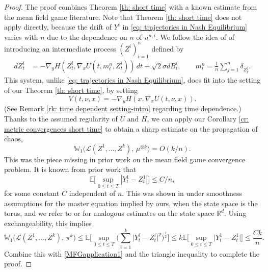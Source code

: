 \documentclass[11pt,reqno]{amsart}
\numberwithin{equation}{section}
\theoremstyle{definition}
\def\E{{\mathbb E}}
\def\R{{\mathbb R}}
\def\L{{\mathcal L}}
\newcommand{\W}{\mathbb W}
\begin{document}
\begin{proof}
The proof combines Theorem \ref{th: short time} with a known estimate from the mean field game literature.
Note that Theorem \ref{th: short time} does not apply directly, because the drift of $Y^i$ in \eqref{eq: trajectories in Nash Equilibrium} varies with $n$ due to the dependence on $n$ of $u^{n,i}$.
We follow the idea of \cite{MasterEquation} of introducing an intermediate process $(Z^i)_{i=1}^n$ defined by
\begin{align} 
    \label{eq: intermediate problem MFGs}
    dZ_t^i&=-\nabla_y H(Z_t^i,\nabla_x U(t,m_{t}^n,Z_t^i))\,dt+\sqrt 2 \sigma dB_t^i, \qquad      m_t^n= \frac 1n \sum_{j=1}^n \delta_{Z_t^j}. 
\end{align}
This system, unlike \eqref{eq: trajectories in Nash Equilibrium}, does fit into the setting of our Theorem \ref{th: short time}, by setting
\[
V(t,\nu,x) = -\nabla_y H(x,\nabla_x U(t,\nu,x)).
\]
(See Remark \ref{rk: time dependent setting-intro} regarding time dependence.) Thanks to the assumed regularity of $U$ and $H$, we can apply our Corollary \ref{cr: metric convergences short time} to obtain a sharp estimate on the propagation of chaos,
\begin{equation}
\W_1\big(\L(Z^1,\ldots,Z^k), \, \mu^{\otimes k}\big) = O(k/n). \label{MFGapplication1}
\end{equation}
This was the piece missing in prior work on the mean field game convergence problem.
It is known from prior work that
\[
\E\bigg[\sup_{0 \le t \le T}|Y^1_t-Z^1_t|\bigg] \le C/n,
\]
for some constant $C$ independent of $n$.
This was shown in \cite[Theorem 6.6]{MasterEquation} under smoothness assumptions for the master equation implied by ours, when the state space is the torus, and we refer to \cite[Theorem 6.32]{CDMFGbook2} or \cite[Theorem 4.2]{DelarueLackerRamananCLT} for analogous estimates on the state space $\R^d$. 
Using exchangeability, this implies
\begin{equation*}
\W_1\big(\L(Z^1,\ldots,Z^k), \, \pi^k\big) \le  \E\bigg[\sup_{0 \le t \le T}\Big(\sum_{i=1}^k \big|Y_t^i-Z_t^i\big|^2\Big)^{\frac 12}\bigg]\leq k \E\Big[\sup_{0 \le t \le T}\big|Y_t^1-Z_t^1\big|\Big] \leq  \frac{Ck}{n}. 
\end{equation*}
Combine this with \eqref{MFGapplication1} and the triangle inequality to complete the proof.
\end{proof}
\end{document}
